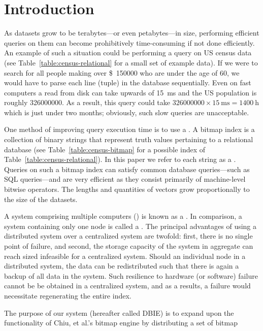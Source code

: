 \section{Introduction}
As datasets grow to be terabytes---or even petabytes---in size, performing
efficient queries on them can become prohibitively time-consuming if not done
efficiently. An example of such a situation could be performing a query on US
census data (see Table~\ref{table:census-relational} for a small set of example
data). If we were to search for all people making over \SI{150000}[\$]{} who
are under the age of 60, we would have to parse each line (tuple) in the
database sequentially. Even on fast computers a read from disk can take upwards
of \SI{15}{\milli\second} and the US population is roughly \num{326000000}.
As a result, this query could take
\(\num{326 000 000} \times \SI{15}{\milli\second} = \SI{1400}{\hour}\)
which is just under two months; obviously, such slow queries are unacceptable.
\par
One method of improving query execution time is to use a . A
bitmap index is a collection of binary strings that represent truth values
pertaining to a relational database (see Table~\ref{table:census-bitmap} for a
possible index of Table~\ref{table:census-relational}). In this paper we refer
to each string as a . Queries on such a bitmap index can
satisfy common database queries---such as SQL 
queries---and are very efficient as they consist primarily of machine-level
bitwise operators. The lengths and quantities of vectors grow proportionally to
the size of the datasets.
\par
A system comprising multiple computers () is known as a
. In comparison, a system containing only one node is
called a . The principal advantages of using a
distributed system over a centralized system are twofold: first, there is no
single point of failure, and second, the storage capacity of the system in
aggregate can reach sized infeasible for a centralized system. Should an
individual node in a distributed system, the data can be redistributed such
that there is again a backup of all data in the system. Such resilience to
hardware (or software) failure cannot be be obtained in a centralized system,
and as a results, a failure would necessitate regenerating the entire index.
\par
The purpose of our system (hereafter called DBIE) is to expand upon the
functionality of Chiu, et al.'s bitmap engine by distributing a set of bitmap
